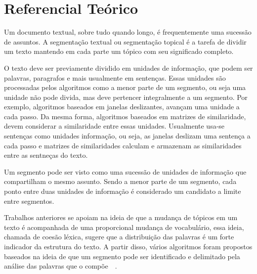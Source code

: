 \section{Referencial Teórico}
	\label{sec:referencial}
	
%
Um documento textual, sobre tudo quando longo, é frequentemente uma sucessão de assuntos. 
%
A segmentação textual ou segmentação topical é a tarefa de dividir um texto mantendo em cada parte um tópico com seu significado completo.
	


%
O texto deve ser previamente dividido em unidades de informação, que podem ser palavras, paragrafos e mais usualmente em sentenças. Essas unidades são processadas pelos algoritmos como a menor parte de um segmento, ou seja uma unidade não pode divida, mas deve pertencer integralmente a um segmento.
%
Por exemplo, algoritmos baseados em janelas deslizantes, avançam uma unidade a cada passo. Da mesma forma, algoritmos baseados em matrizes de similaridade, devem considerar a similaridade entre essas unidades.
%
Usualmente usa-se sentenças como unidades informação, ou seja, as janelas deslizam uma sentença a cada passo e matrizes de similaridades calculam e armazenam as similaridades entre as sentneças do texto.
 
Um segmento pode ser visto como uma sucessão de unidades de informação que compartilham o mesmo assunto. Sendo a menor parte de um segmento, cada ponto entre duas unidades de informação é considerado um candidato a limite entre segmentos. 



Trabalhos anteriores se apoiam na ideia de que a mudança de tópicos em um texto é acompanhada de uma proporcional mudança de vocabulário, essa ideia, chamada de coesão léxica, sugere que a distribuição das palavras é um forte indicador da estrutura do texto. A partir disso, vários algoritmos foram propostos baseados na ideia de que um segmento pode ser identificado e delimitado pela análise das palavras que o compõe~\cite{Galley2003}~\cite{Boguraev2000}.



